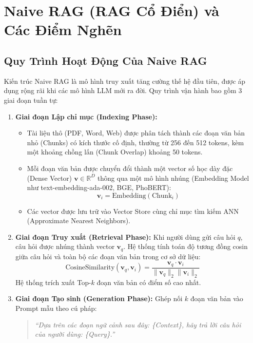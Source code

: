 \documentclass[12pt,a4paper]{report}
\begin{document}
\section{Naive RAG (RAG Cổ Điển) và Các Điểm Nghẽn}

\subsection{Quy Trình Hoạt Động Của Naive RAG}
Kiến trúc Naive RAG là mô hình truy xuất tăng cường thế hệ đầu tiên, được áp dụng rộng rãi khi các mô hình LLM mới ra đời. Quy trình vận hành bao gồm 3 giai đoạn tuần tự:
\begin{enumerate}
    \item \textbf{Giai đoạn Lập chỉ mục (Indexing Phase):}
    \begin{itemize}
        \item Tài liệu thô (PDF, Word, Web) được phân tách thành các đoạn văn bản nhỏ (Chunks) có kích thước cố định, thường từ 256 đến 512 tokens, kèm một khoảng chồng lấn (Chunk Overlap) khoảng 50 tokens.
        \item Mỗi đoạn văn bản được chuyển đổi thành một vector số học dày đặc (Dense Vector) $\mathbf{v} \in \mathbb{R}^D$ thông qua một mô hình nhúng (Embedding Model như text-embedding-ada-002, BGE, PhoBERT):
        \begin{equation}
            \mathbf{v}_i = \text{Embedding}(\text{Chunk}_i)
        \end{equation}
        \item Các vector được lưu trữ vào Vector Store cùng chỉ mục tìm kiếm ANN (Approximate Nearest Neighbors).
    \end{itemize}
    \item \textbf{Giai đoạn Truy xuất (Retrieval Phase):}
    Khi người dùng gửi câu hỏi $q$, câu hỏi được nhúng thành vector $\mathbf{v}_q$. Hệ thống tính toán độ tương đồng cosin giữa câu hỏi và toàn bộ các đoạn văn bản trong cơ sở dữ liệu:
    \begin{equation}
        \text{CosineSimilarity}(\mathbf{v}_q, \mathbf{v}_i) = \frac{\mathbf{v}_q \cdot \mathbf{v}_i}{\|\mathbf{v}_q\|_2 \|\mathbf{v}_i\|_2}
    \end{equation}
    Hệ thống trích xuất Top-$k$ đoạn văn bản có điểm số cao nhất.
    \item \textbf{Giai đoạn Tạo sinh (Generation Phase):}
    Ghép nối $k$ đoạn văn bản vào Prompt mẫu theo cú pháp:
    \begin{quote}
        \textit{“Dựa trên các đoạn ngữ cảnh sau đây: \{Context\}, hãy trả lời câu hỏi của người dùng: \{Query\}.”}
    \end{quote}
\end{enumerate}
\end{document}

